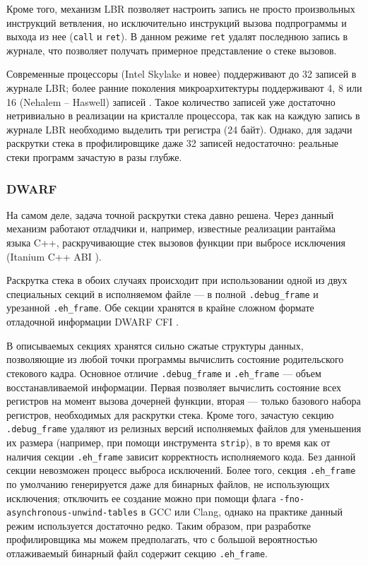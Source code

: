Кроме того, механизм LBR позволяет настроить запись не просто произвольных инструкций ветвления, но исключительно инструкций
вызова подпрограммы и выхода из нее (\verb!call! и \verb!ret!).
В данном режиме \verb!ret! удалят последнюю запись в журнале, что позволяет получать примерное представление о стеке вызовов.

Современные процессоры (Intel Skylake и новее) поддерживают до 32 записей в журнале LBR;
более ранние поколения микроархитектуры поддерживают 4, 8 или 16 (Nehalem – Haswell) записей \cite{lbr:lwn}.
Такое количество записей уже достаточно нетривиально в реализации на кристалле процессора,
так как на каждую запись в журнале LBR необходимо выделить три регистра (24 байт).
Однако, для задачи раскрутки стека в профилировщике даже 32 записей недостаточно: реальные стеки программ зачастую в разы глубже.

\subsubsection{DWARF} \label{sec:dwarf}
На самом деле, задача точной раскрутки стека давно решена.
Через данный механизм работают отладчики и, например, известные реализации рантайма языка C++,
раскручивающие стек вызовов функции при выбросе исключения (Itanium C++ ABI \cite{itanium:eh}).

Раскрутка стека в обоих случаях происходит при использовании одной из двух специальных секций в исполняемом файле ---
в полной \verb!.debug_frame! и урезанной \verb!.eh_frame!.
Обе секции хранятся в крайне сложном формате отладочной информации DWARF CFI \cite{dwarf}.

В описываемых секциях хранятся сильно сжатые структуры данных, позволяющие из любой точки программы вычислить
состояние родительского стекового кадра. Основное отличие \verb!.debug_frame! и \verb!.eh_frame! --- объем восстанавливаемой информации.
Первая позволяет вычислить состояние всех регистров на момент вызова дочерней функции, вторая --- только базового набора регистров,
необходимых для раскрутки стека.
Кроме того, зачастую секцию \verb!.debug_frame! удаляют из релизных версий исполняемых файлов для уменьшения их размера
(например, при помощи инструмента \verb!strip!), в то время как от наличия секции \verb!.eh_frame!
зависит корректность исполняемого кода. Без данной секции невозможен процесс выброса исключений.
Более того, секция \verb!.eh_frame! по умолчанию генерируется даже для бинарных файлов, не использующих исключения;
отключить ее создание можно при помощи флага \verb!-fno-asynchronous-unwind-tables! в GCC или Clang, однако на практике
данный режим используется достаточно редко.
Таким образом, при разработке профилировщика мы можем предполагать, что с большой вероятностью отлаживаемый бинарный файл содержит
секцию \verb!.eh_frame!.

